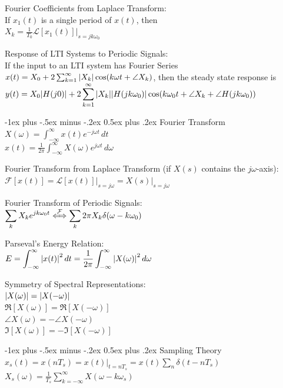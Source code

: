 \documentclass[12pt,landscape,letterpaper]{article}
\makeatletter
\renewcommand{\section}{\@startsection{section}{1}{0mm}%
                                {-1ex plus -.5ex minus -.2ex}%
                                {0.5ex plus .2ex}%
                                {\normalfont\normalsize\bfseries}}
\newcommand{\tab}{\hspace{0.02\textwidth}}
\newcommand{\ds}{\displaystyle}
\makeatother
\begin{document}
\begin{multicols*}{3}
\columnbreak
Fourier Coefficients from Laplace Transform:\\
\tab If $x_1(t)$ is a single period of $x(t)$, then\\
\tab $X_k = \frac{1}{T_0}\mathcal{L}[x_1(t)] \big\rvert_{s = jk\omega_0}$

Response of LTI Systems to Periodic Signals:\\
\tab If the input to an LTI system has Fourier Series $x(t) = X_0 + 2\sum_{k=1}^{\infty}\abs{X_k}\cos(k\omega t + \angle X_k)$, then the steady state response is $\ds y(t) = X_0\abs{H(j0)} + 2\sum_{k=1}^{\infty}\abs{X_k}\abs{H(jk\omega_0)}\cos(k\omega_0 t + \angle X_k + \angle H(jk\omega_0))$

\section{Fourier Transform}
\tab $X(\omega) = \int_{-\infty}^{\infty}x(t)e^{-j\omega t}\,dt$\\
\tab $x(t) = \frac{1}{2\pi}\int_{-\infty}^{\infty}X(\omega)e^{j\omega t}\,d\omega$

Fourier Transform from Laplace Transform (if $X(s)$ contains the $j\omega$-axis):\\
\tab $\mathcal{F}[x(t)] = \mathcal{L}[x(t)]\big\rvert_{s = j\omega} = X(s)\big\rvert_{s = j\omega}$

Fourier Transform of Periodic Signals:\\
\tab $\ds \sum_k X_k e^{jk\omega_0 t} \xLeftrightarrow{\mathcal{F}} \sum_k 2\pi X_k \delta(\omega - k\omega_0)$

Parseval's Energy Relation:\\
\tab $\ds E = \int_{-\infty}^{\infty} \abs{x(t)}^2\,dt = \frac{1}{2\pi}\int_{-\infty}^{\infty}\abs{X(\omega)}^2\,d\omega$

Symmetry of Spectral Representations:\\
\tab $\abs{X(\omega)} = \abs{X(-\omega)}$\\
\tab $\Re[X(\omega)] = \Re[X(-\omega)]$\\
\tab $\angle X(\omega) = -\angle X(-\omega)$\\
\tab $\Im[X(\omega)] = -\Im[X(-\omega)]$

\section{Sampling Theory}
\tab $x_s(t) = x(nT_s) = x(t)\rvert_{t = nT_s} = x(t)\sum_n \delta(t - nT_s)$\\
\tab $\ds X_s(\omega) = \frac{1}{T_s} \sum_{k=-\infty}^{\infty}X(\omega - k\omega_s)$


\end{multicols*}
\end{document}
